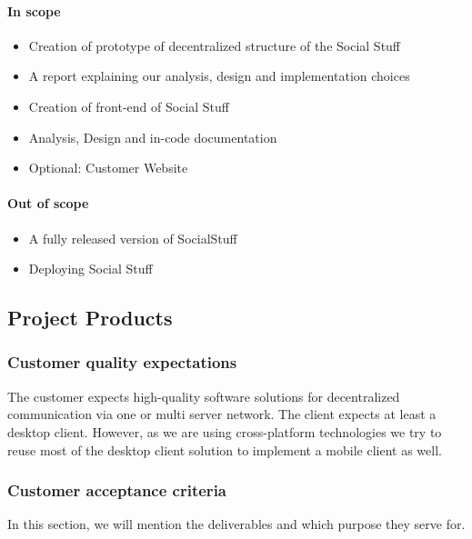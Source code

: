\paragraph{In scope}
\begin{itemize}
    \item Creation of prototype of decentralized structure of the Social Stuff
    \item A report explaining our analysis, design and implementation choices
    \item Creation of front-end of Social Stuff
    \item Analysis, Design and in-code documentation
    \item Optional: Customer Website
\end{itemize}

\paragraph{Out of scope}
\begin{itemize}
    \item A fully released version of SocialStuff
    \item Deploying Social Stuff
\end{itemize}

\subsection{Project Products}

\subsubsection{Customer quality expectations}

The customer expects high-quality software solutions for decentralized communication via one or multi server network.
The client expects at least a desktop client.
However, as we are using cross-platform technologies we try to reuse most of the desktop client solution to implement
a mobile client as well.

\subsubsection{Customer acceptance criteria}

In this section, we will mention the deliverables and which purpose they serve for.

